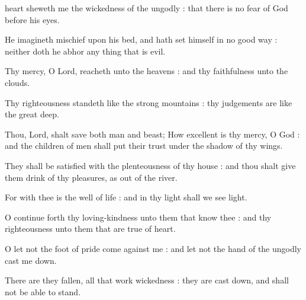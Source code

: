  heart sheweth me the wickedness of the ungodly : that there is no fear of God before his eyes.\par
{}
He imagineth mischief upon his bed, and hath set himself in no good way : neither doth he abhor any thing that is evil.\par
{}Thy mercy, O Lord, reacheth unto the heavens : and thy faithfulness unto the clouds.\par
{}Thy righteousness standeth like the strong mountains : thy judgements are like the great deep.\par
{}Thou, Lord, shalt save both man and beast; How excellent is thy mercy, O God : and the children of men shall put their trust under the shadow of thy wings.\par
{}They shall be satisfied with the plenteousness of thy house : and thou shalt give them drink of thy pleasures, as out of the river.\par
{}For with thee is the well of life : and in thy light shall we see light.\par
{}O continue forth thy loving-kindness unto them that know thee : and thy righteousness unto them that are true of heart.\par
{}O let not the foot of pride come against me : and let not the hand of the ungodly cast me down.\par
{}There are they fallen, all that work wickedness : they are cast down, and shall not be able to stand.\par



